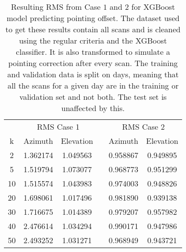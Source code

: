 \begin{table}[h]
    \centering %
    \caption{Resulting RMS from Case $1$ and $2$ for XGBoost model predicting pointing offset.
    The dataset used to get these results contain all scans and is cleaned using the regular criteria and the XGBoost classifier.
    It is also transformed to simulate a pointing correction after every scan.
    The training and validation data is split on days, meaning that all the scans for a given day
    are in the training or validation set and not both. The test set is unaffected by this.}
    \begin{tabular}{ccc c cc}
        \toprule
        \multicolumn{1}{c}{} & \multicolumn{2}{c}{RMS Case 1} & & \multicolumn{2}{c}{RMS Case 2} \\
        \cmidrule(lr){2-3} \cmidrule(lr){5-6}
         k & Azimuth & Elevation & & Azimuth & Elevation \\
        \midrule
        2 &  1.362174 &  1.049563 & &  0.958867 &  0.949895 \\
        5 &  1.519794 &  1.073077 & &  0.968773 &  0.951299 \\
       10 &  1.515574 &  1.043983 & &  0.974003 &  0.948826 \\
       20 &  1.698061 &  1.017496 & &  0.981890 &  0.939138 \\
       30 &  1.716675 &  1.014389 & &  0.979207 &  0.957982 \\
       40 &  2.476614 &  1.034294 & &  0.990171 &  0.947986 \\
       50 &  2.493252 &  1.031271 & &  0.968949 &  0.943721 \\
        \bottomrule
    \end{tabular}        
\end{table}